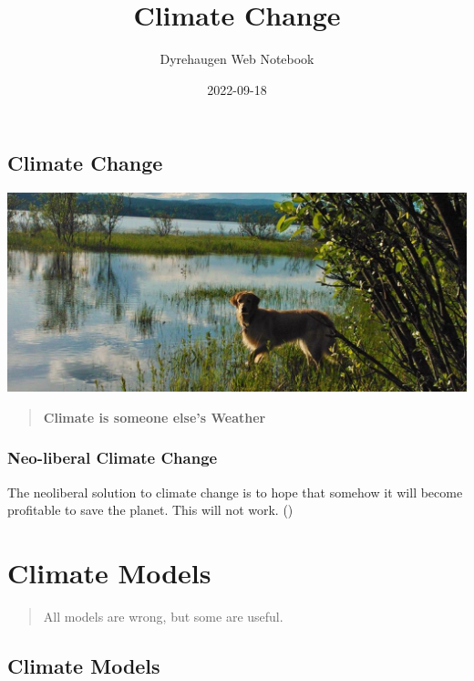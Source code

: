 \documentclass[
]{book}
\title{Climate Change}
\author{Dyrehaugen Web Notebook}
\date{2022-09-18}
\begin{document}
\maketitle

{
\setcounter{tocdepth}{1}
\tableofcontents
}
\hypertarget{climate-change}{%
\chapter{Climate Change}\label{climate-change}}

\includegraphics{fig/zelda.jpg}

\begin{quote}
\textbf{Climate is someone else's Weather}
\end{quote}

\hypertarget{neo-liberal-climate-change}{%
\section{Neo-liberal Climate Change}\label{neo-liberal-climate-change}}

The neoliberal solution to climate change is to hope
that somehow it will become profitable to save the planet.
This will not work.
(\citet{ExistentialComics})

\hypertarget{part-climate-models}{%
\part{Climate Models}\label{part-climate-models}}

\begin{quote}
All models are wrong, but some are useful.
\end{quote}

\hypertarget{climate-models}{%
\chapter{Climate Models}\label{climate-models}}
\end{document}
